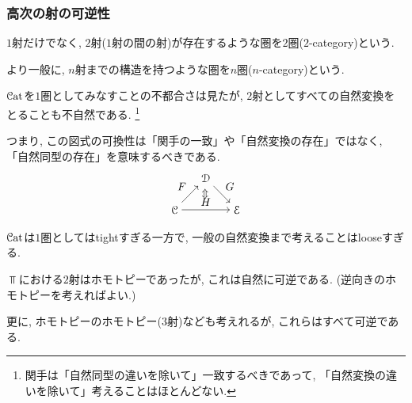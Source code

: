 \documentclass[aspectratio=169, dvipdfmx, 8pt, notheorems, uplatex]{beamer}
\begin{document}
\begin{frame}
  \frametitle{高次の射の可逆性}

  $1$射だけでなく, $2$射($1$射の間の射)が存在するような圏を$2$圏($2$-category)という. 
  
  より一般に, $n$射までの構造を持つような圏を$n$圏($n$-category)という. 

  \begin{remark}
    $\mathcal{C}\mathrm{at}$を$1$圏としてみなすことの不都合さは見たが, $2$射としてすべての自然変換をとることも不自然である. 
    \footnote{
      関手は「自然同型の違いを除いて」一致するべきであって, 「自然変換の違いを除いて」考えることはほとんどない. 
    }
    
    つまり, この図式の可換性は「関手の一致」や「自然変換の存在」ではなく, 「自然同型の存在」を意味するべきである.     
    \[
    \begin{tikzpicture}[auto,->]
      \node (0) at (0,0) {$\C$};
      \node (1) at (1,1) {$\D$};
      \node (2) at (2,0) {$\E$};
      \node (star) at (1,0.5) {\rotatebox{90}{$\Leftrightarrow$}};
      \draw (0) -- node {$F$} (1);
      \draw (1) -- node {$G$} (2);
      \draw (0) -- node {$H$} (2);
    \end{tikzpicture}
    \]
  \end{remark}

  $\mathcal{C}\mathrm{at}$は$1$圏としてはtightすぎる一方で, 一般の自然変換まで考えることはlooseすぎる. 

  \begin{example}
    $\Top$における$2$射はホモトピーであったが, これは自然に可逆である. (逆向きのホモトピーを考えればよい.)

    更に, ホモトピーのホモトピー(3射)なども考えれるが, これらはすべて可逆である. 
  \end{example}

\end{frame}
\end{document}
